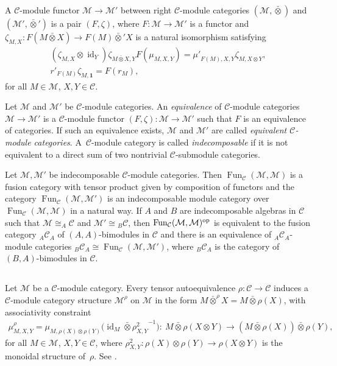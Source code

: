 \documentclass[11pt]{article}
\numberwithin{equation}{section}
\newcommand{\oot}{\bar\otimes}
\newcommand{\C}{{\mathcal C}}
\newcommand{\M}{{\mathcal M}}
\newcommand{\1}{\textbf{1}}
\newcommand\id{\operatorname{id}}
\begin{document}
A $\C$-module functor $\M \to \M'$ between right $\C$-module categories $(\M, \oot)$ and $(\M', \oot')$ is a pair $(F, \zeta)$, where $F\colon \M\to \M'$ is a functor and $\zeta_{M, X}\colon F(M \oot X) \to F(M) \oot' X$ is a natural isomorphism satisfying
\begin{gather}\label{uno-z} (\zeta_{M, X} \otimes \id_Y ) \zeta_{M \oot X, Y} F(\mu_{M, X, Y}) = {\mu'}_{F(M), X, Y} \zeta_{M, X \otimes Y},\\
\label{dos-z} {r'}_{F(M)} \zeta_{M, \1} = F(r_M),
\end{gather}
for all $M \in \M$, $X, Y \in \C$.

Let $\M$ and $\M'$ be $\C$-module categories. An \emph{equivalence} of $\C$-module categories $\M \to \M'$ is a $\C$-module functor $(F, \zeta)\colon \M\to \M'$ such that $F$ is an equivalence of categories. If such an equivalence exists, $\M$ and $\M'$ are called \emph{equivalent $\C$-module categories}. A~$\C$-module category is called \emph{indecomposable} if it is not equivalent to a direct sum of two nontrivial $\mathcal{C}$-submodule categories.

Let $\M, \M'$ be indecomposable $\C$-module categories. Then $\operatorname{Fun}_\C(\M, \M)$ is a fusion category with tensor product given by composition of functors and the category $\operatorname{Fun}_\C(\M, \M')$ is an indecomposable module category over $\operatorname{Fun}_\C(\M, \M)$ in a natural way. If $A$ and $B$ are indecomposable algebras in $\C$ such that $\M \cong _A\!\C$ and $\M' \cong {}_B\C$, then $\operatorname{Fun}_\C(\M, \M)^{\rm op}$ is equivalent to the fusion category $_A\C_A$ of $(A, A)$-bimodules in $\C$ and there is an equivalence of $_A\C_A$-module categories $_B\C_A \cong \operatorname{Fun}_\C(\M, \M')$, where $_B\C_A$ is the category of $(B, A)$-bimodules in $\C$.

\subsection{}\label{action-mc} Let $\M$ be a $\C$-module category. Every tensor autoequivalence $\rho\colon \C \to \C$ induces a $\C$-module category structure $\M^\rho$ on $\M$ in the form $M \oot^\rho X = M\oot \rho(X)$, with associativity constraint
\begin{gather*}\mu^\rho_{M, X, Y} = \mu_{M, \rho(X) \otimes \rho(Y)} \big(\id_M \oot {\rho^2_{X, Y}}^{-1}\big)\colon \ M \oot \rho(X\otimes Y) \to (M\oot \rho(X)) \oot \rho(Y),\end{gather*} for all $M \in \M$, $X, Y \in \C$, where $\rho^2_{X, Y}\colon \rho(X) \otimes \rho(Y) \to \rho(X \otimes Y)$ is the monoidal structure of~$\rho$. See \cite[Section~3.2]{nikshych}.
\end{document}
